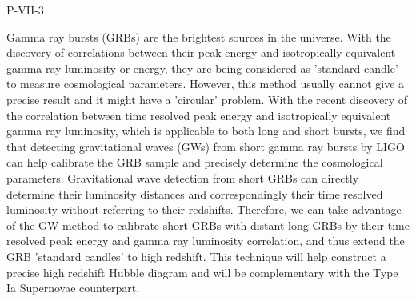 P-VII-3


\bigskip



\bigskip

\noindent Gamma ray bursts (GRBs) are the brightest sources in the universe. With the discovery of correlations between their peak energy and isotropically equivalent gamma ray luminosity or energy, they are being considered as 'standard candle' to measure cosmological parameters. However, this method usually cannot give a precise result and it might have a 'circular' problem. With the recent discovery of the correlation between time resolved peak energy and isotropically equivalent gamma ray luminosity, which is applicable to both long and short bursts, we find that detecting gravitational waves (GWs) from short gamma ray bursts by LIGO can help calibrate the GRB sample and precisely determine the cosmological parameters. Gravitational wave detection from short GRBs can directly determine their luminosity distances and correspondingly their time resolved luminosity without referring to their redshifts. Therefore, we can take advantage of the GW method to calibrate short GRBs with distant long GRBs by their time resolved peak energy and gamma ray luminosity correlation, and thus extend the GRB 'standard candles' to high redshift. This technique will help construct a precise high redshift Hubble diagram and will be complementary with the Type Ia Supernovae counterpart.
